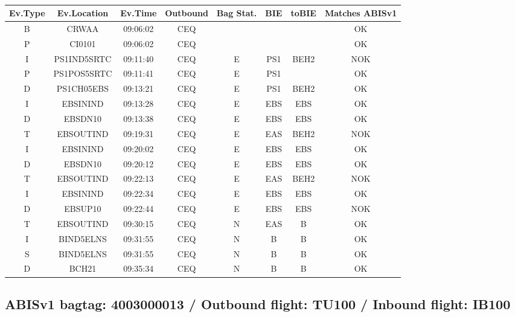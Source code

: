 \documentclass{report}
\begin{document}
\paragraph{}
\begin{longtable}{cccccccc}    \toprule
\rowcolor{white!50}
\textbf{Ev.Type} & \textbf{Ev.Location} & \textbf{Ev.Time} & \textbf{Outbound} & \textbf{Bag Stat.} & \textbf{BIE} & \textbf{toBIE} & \textbf{Matches ABISv1} \\\midrule
B & CRWAA & 09:06:02  & CEQ &  &  &  & OK\\
P & CI0101 & 09:06:02  & CEQ &  &  &  & OK\\
I & PS1IND5SRTC & 09:11:40  & CEQ & E & PS1 & BEH2 & NOK\\
P & PS1POS5SRTC & 09:11:41  & CEQ & E & PS1 &  & OK\\
D & PS1CH05EBS & 09:13:21  & CEQ & E & PS1 & BEH2 & OK\\
I & EBSININD & 09:13:28  & CEQ & E & EBS & EBS & OK\\
D & EBSDN10 & 09:13:38  & CEQ & E & EBS & EBS & OK\\
T & EBSOUTIND & 09:19:31  & CEQ & E & EAS & BEH2 & NOK\\
I & EBSININD & 09:20:02  & CEQ & E & EBS & EBS & OK\\
D & EBSDN10 & 09:20:12  & CEQ & E & EBS & EBS & OK\\
T & EBSOUTIND & 09:22:13  & CEQ & E & EAS & BEH2 & NOK\\
I & EBSININD & 09:22:34  & CEQ & E & EBS & EBS & OK\\
D & EBSUP10 & 09:22:44  & CEQ & E & EBS & EBS & NOK\\
T & EBSOUTIND & 09:30:15  & CEQ & N & EAS & B & OK\\
I & BIND5ELNS & 09:31:55  & CEQ & N & B & B & OK\\
S & BIND5ELNS & 09:31:55  & CEQ & N & B & B & OK\\
D & BCH21 & 09:35:34  & CEQ & N & B & B & OK\\
\bottomrule
\end{longtable}
\subsection*{ABISv1 bagtag: 4003000013 / Outbound flight: TU100 / Inbound flight: IB100}
\end{document}
